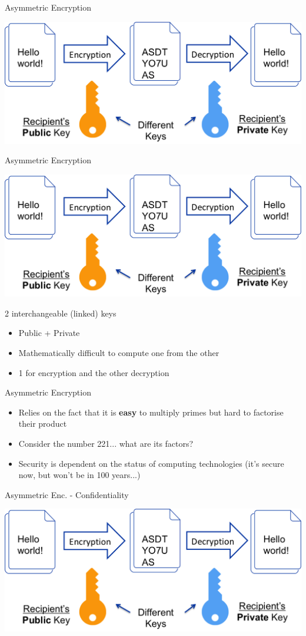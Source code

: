 \documentclass{beamer}
\begin{document}
\begin{frame}{Asymmetric Encryption}
\begin{center}
\includegraphics[width=0.8\linewidth]{asymmetric-encryption.png}
\end{center}
\end{frame}

\begin{frame}{Asymmetric Encryption}
\begin{center}
	\includegraphics[width=0.45\linewidth]{asymmetric-encryption.png}
\end{center}
2 interchangeable (linked) keys
\begin{itemize}
  \item Public + Private 
  \item Mathematically difficult to compute one from the other 
  \item 1 for encryption and the other decryption
\end{itemize} 
\end{frame}

\begin{frame}{{\color{red}Asymmetric Encryption}}
\begin{itemize}
\item Relies on the fact that it is \textbf{easy} to multiply primes but hard to factorise their product
\item Consider the number 221... what are its factors?
\item Security is dependent on the status of computing technologies (it's secure now, but won't be in 100 years...)
\end{itemize}
\end{frame}

\begin{frame}{{\color{red}Asymmetric Enc. - Confidentiality}}
\begin{center}
\includegraphics[width=0.9\linewidth]{asymmetric-encryption.png}
\end{center}
\end{frame}
\end{document}
